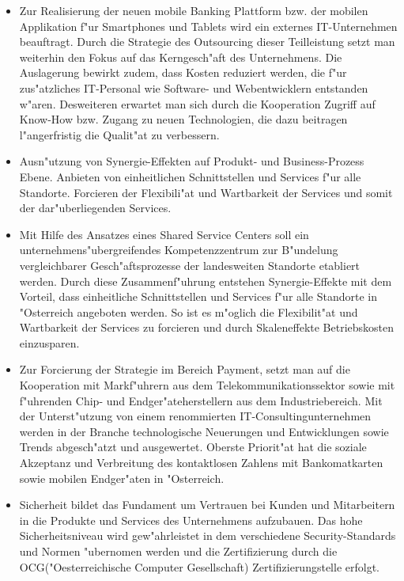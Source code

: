 \begin{itemize}

	\item Zur Realisierung der neuen mobile Banking Plattform bzw. der mobilen Applikation f"ur Smartphones und Tablets wird ein externes IT-Unternehmen beauftragt. Durch die Strategie des Outsourcing dieser Teilleistung setzt man weiterhin den Fokus auf das Kerngesch"aft des Unternehmens. Die Auslagerung bewirkt zudem, dass Kosten reduziert werden, die f"ur zus"atzliches IT-Personal wie Software- und Webentwicklern entstanden w"aren. Desweiteren erwartet man sich durch die Kooperation Zugriff auf Know-How bzw. Zugang zu neuen Technologien, die dazu beitragen l"angerfristig die Qualit"at zu verbessern. \\
		
	
	\item Ausn"utzung von Synergie-Effekten auf Produkt- und Business-Prozess Ebene. Anbieten von einheitlichen Schnittstellen und Services f"ur alle Standorte. Forcieren der Flexibili"at und Wartbarkeit der Services und somit der dar"uberliegenden Services. 

	\item Mit Hilfe des Ansatzes eines Shared Service Centers soll ein unternehmens"ubergreifendes Kompetenzzentrum zur B"undelung vergleichbarer Gesch"aftsprozesse der landesweiten Standorte etabliert werden. Durch diese Zusammenf"uhrung entstehen Synergie-Effekte mit dem Vorteil, dass einheitliche Schnittstellen und Services f"ur alle Standorte in "Osterreich angeboten werden. So ist es m"oglich die Flexibilit"at und Wartbarkeit der Services zu forcieren und durch Skaleneffekte Betriebskosten einzusparen.\\

	\item Zur Forcierung der Strategie im Bereich Payment, setzt man auf die Kooperation mit Markf"uhrern aus dem Telekommunikationssektor sowie mit f"uhrenden Chip- und Endger"ateherstellern aus dem Industriebereich. Mit der Unterst"utzung von einem renommierten IT-Consultingunternehmen werden in der Branche technologische Neuerungen und Entwicklungen sowie Trends abgesch"atzt und ausgewertet. Oberste Priorit"at hat die soziale Akzeptanz und Verbreitung des kontaktlosen Zahlens mit Bankomatkarten sowie mobilen Endger"aten in "Osterreich.\\


	\item Sicherheit bildet das Fundament um Vertrauen bei Kunden und Mitarbeitern in die Produkte und Services des Unternehmens aufzubauen. Das hohe Sicherheitsniveau wird gew"ahrleistet in dem verschiedene Security-Standards und Normen "ubernomen werden und die Zertifizierung durch die OCG("Oesterreichische Computer Gesellschaft) Zertifizierungstelle erfolgt.
	
\end{itemize}